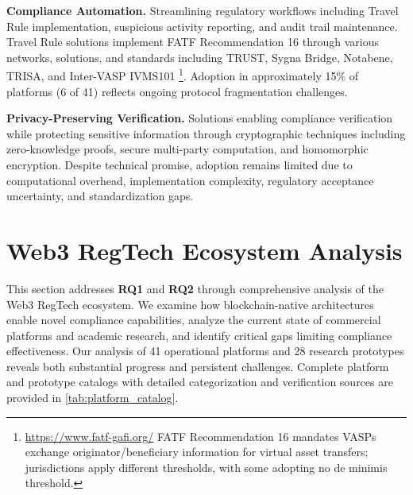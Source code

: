\documentclass[conference,compsoc]{IEEEtran}
\begin{document}
\noindent\textbf{Compliance Automation.}
Streamlining regulatory workflows including Travel Rule implementation, suspicious activity reporting, and audit trail maintenance. Travel Rule solutions implement FATF Recommendation 16 through various networks, solutions, and standards including TRUST, Sygna Bridge, Notabene, TRISA, and Inter-VASP IVMS101 \footnote{\url{https://www.fatf-gafi.org/} FATF Recommendation 16 mandates VASPs exchange originator/beneficiary information for virtual asset transfers; jurisdictions apply different thresholds, with some adopting no de minimis threshold.}. Adoption in approximately 15\% of platforms (6 of 41) reflects ongoing protocol fragmentation challenges.

\noindent\textbf{Privacy-Preserving Verification.}
Solutions enabling compliance verification while protecting sensitive information through cryptographic techniques including zero-knowledge proofs, secure multi-party computation, and homomorphic encryption. Despite technical promise, adoption remains limited due to computational overhead, implementation complexity, regulatory acceptance uncertainty, and standardization gaps.



\section{Web3 RegTech Ecosystem Analysis}
\label{sec:ecosystem}

This section addresses \textbf{RQ1} and \textbf{RQ2} through comprehensive analysis of the Web3 RegTech ecosystem. We examine how blockchain-native architectures enable novel compliance capabilities, analyze the current state of commercial platforms and academic research, and identify critical gaps limiting compliance effectiveness. Our analysis of 41 operational platforms and 28 research prototypes reveals both substantial progress and persistent challenges. Complete platform and prototype catalogs with detailed categorization and verification sources are provided in \autoref{tab:platform_catalog}.
\end{document}
